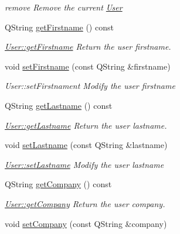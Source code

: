 \begin{DoxyCompactItemize}
\begin{DoxyCompactList}\small\item\em remove Remove the current \hyperlink{classModels_1_1User}{User} \end{DoxyCompactList}\item 
Q\+String \hyperlink{classModels_1_1User_a409a0a6becdd16b9a34120511526ab4d}{get\+Firstname} () const 
\begin{DoxyCompactList}\small\item\em \hyperlink{classModels_1_1User_a409a0a6becdd16b9a34120511526ab4d}{User\+::get\+Firstname} Return the user firstname. \end{DoxyCompactList}\item 
void \hyperlink{classModels_1_1User_a9fdff0463dc3653dd3c3bb7b60bf6c98}{set\+Firstname} (const Q\+String \&firstname)
\begin{DoxyCompactList}\small\item\em User\+::set\+Firstnament Modify the user {\itshape firstname} \end{DoxyCompactList}\item 
Q\+String \hyperlink{classModels_1_1User_acd71c39455f4289dac70fe3688b956a6}{get\+Lastname} () const 
\begin{DoxyCompactList}\small\item\em \hyperlink{classModels_1_1User_acd71c39455f4289dac70fe3688b956a6}{User\+::get\+Lastname} Return the user lastname. \end{DoxyCompactList}\item 
void \hyperlink{classModels_1_1User_a3537478a5fe9e2bcb74cd7e267ca1a5f}{set\+Lastname} (const Q\+String \&lastname)
\begin{DoxyCompactList}\small\item\em \hyperlink{classModels_1_1User_a3537478a5fe9e2bcb74cd7e267ca1a5f}{User\+::set\+Lastname} Modify the user {\itshape lastname} \end{DoxyCompactList}\item 
Q\+String \hyperlink{classModels_1_1User_a5c2a1436bfaaf39df26d1ff45196ff43}{get\+Company} () const 
\begin{DoxyCompactList}\small\item\em \hyperlink{classModels_1_1User_a5c2a1436bfaaf39df26d1ff45196ff43}{User\+::get\+Company} Return the user company. \end{DoxyCompactList}\item 
void \hyperlink{classModels_1_1User_ab51a6e7ea016ad3c7d18c754582edd53}{set\+Company} (const Q\+String \&company)

\end{DoxyCompactItemize}
